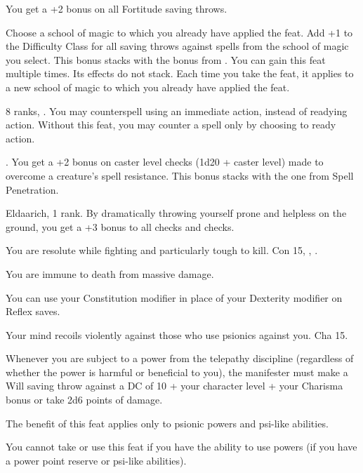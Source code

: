 {You get a +2 bonus on all Fortitude saving throws.}

{Choose a school of magic to which you already have applied the  feat.}{}
{Add +1 to the Difficulty Class for all saving throws against spells from the school of magic you select. This bonus stacks with the bonus from .}{}
{You can gain this feat multiple times. Its effects do not stack. Each time you take the feat, it applies to a new school of magic to which you already have applied the  feat.}{}

{}
{ 8 ranks, .}
{You may counterspell using an immediate action, instead of readying action.}
{Without this feat, you may counter a spell only by choosing to ready action.}
{}

{.}
{You get a +2 bonus on caster level checks (1d20 + caster level) made to overcome a creature's spell resistance. This bonus stacks with the one from Spell Penetration.}

{Eldaarich,  1 rank.}
{By dramatically throwing yourself prone and helpless on the ground, you get a +3 bonus to all  checks and  checks.}

{You are resolute while fighting and particularly tough to kill.}
{Con 15, , .}
{You are immune to death from massive damage.

You can use your Constitution modifier in place of your Dexterity modifier on Reflex saves.}
{}{}

{Your mind recoils violently against those who use psionics against you.}
{Cha 15.}
{Whenever you are subject to a power from the telepathy discipline (regardless of whether the power is harmful or beneficial to you), the manifester must make a Will saving throw against a DC of 10 + \onehalf your character level + your Charisma bonus or take 2d6 points of damage.

The benefit of this feat applies only to psionic powers and psi-like abilities. %
}{}
{You cannot take or use this feat if you have the ability to use powers (if you have a power point reserve or psi-like abilities).}

